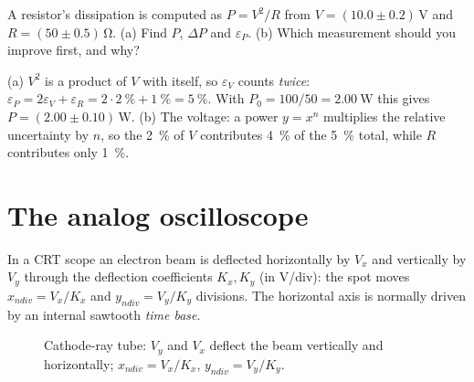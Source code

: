 \documentclass[11pt,a4paper,oneside]{book}
\begin{document}
\begin{exercise}
A resistor's dissipation is computed as $P=V^2/R$ from
$V=(10.0\pm0.2)\,\unit{\volt}$ and $R=(50\pm0.5)\,\unit{\ohm}$.
(a) Find $P$, $\Delta P$ and $\varepsilon_P$.
(b) Which measurement should you improve first, and why?
\end{exercise}
\begin{solution}
(a) $V^2$ is a product of $V$ with itself, so $\varepsilon_V$ counts
\emph{twice}: $\varepsilon_P=2\varepsilon_V+\varepsilon_R
=2\cdot\qty{2}{\percent}+\qty{1}{\percent}=\qty{5}{\percent}$. With
$P_0=100/50=\qty{2.00}{\watt}$ this gives $P=(2.00\pm0.10)\,\unit{\watt}$.
(b) The voltage: a power $y=x^n$ multiplies the relative uncertainty by $n$,
so the \qty{2}{\percent} of $V$ contributes \qty{4}{\percent} of the
\qty{5}{\percent} total, while $R$ contributes only \qty{1}{\percent}.
\end{solution}

\chapter{The analog oscilloscope}\label{ch:analog}

In a CRT scope an electron beam is deflected horizontally by $V_x$ and vertically
by $V_y$ through the deflection coefficients $K_x,K_y$ (in V/div): the spot moves
$x_{ndiv}=V_x/K_x$ and $y_{ndiv}=V_y/K_y$ divisions. The horizontal axis is
normally driven by an internal sawtooth \emph{time base}.

\begin{figure}[h]\centering
{}
\caption{Cathode-ray tube: $V_y$ and $V_x$ deflect the beam vertically and
horizontally; $x_{ndiv}=V_x/K_x$, $y_{ndiv}=V_y/K_y$.}
\label{fig:crt}
\end{figure}
\end{document}
